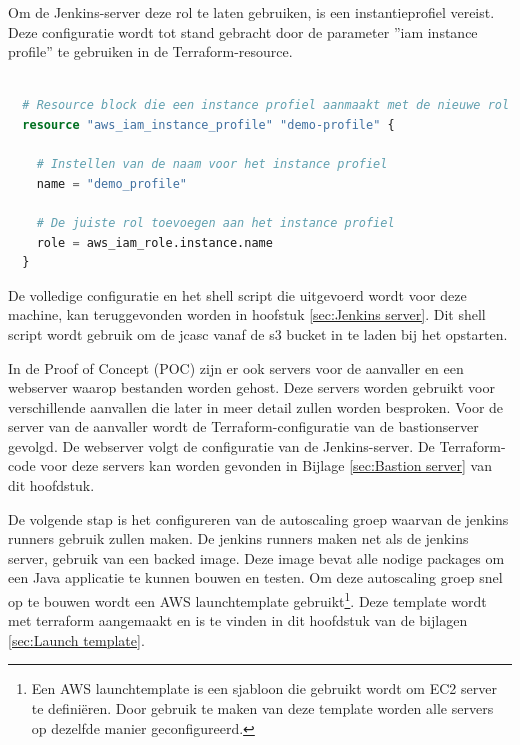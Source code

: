\vspace{0.5cm}
Om de Jenkins-server deze rol te laten gebruiken, is een instantieprofiel vereist. Deze configuratie wordt tot stand gebracht door de parameter ''iam instance profile'' te gebruiken in de Terraform-resource.
\newline

\begin{lstlisting}[language=terraform]
  
  # Resource block die een instance profiel aanmaakt met de nieuwe rol
  resource "aws_iam_instance_profile" "demo-profile" {

    # Instellen van de naam voor het instance profiel
    name = "demo_profile"

    # De juiste rol toevoegen aan het instance profiel
    role = aws_iam_role.instance.name
  } 
\end{lstlisting}

\vspace{0.5cm}
De volledige configuratie en het shell script die uitgevoerd wordt voor deze machine, kan teruggevonden worden in hoofstuk \ref{sec:Jenkins server}. Dit shell script wordt gebruik om de jcasc vanaf de s3 bucket in te laden bij het opstarten.
\newline

In de Proof of Concept (POC) zijn er ook servers voor de aanvaller en een webserver waarop bestanden worden gehost. Deze servers worden gebruikt voor verschillende aanvallen die later in meer detail zullen worden besproken. Voor de server van de aanvaller wordt de Terraform-configuratie van de bastionserver gevolgd. De webserver volgt de configuratie van de Jenkins-server. De Terraform-code voor deze servers kan worden gevonden in Bijlage \ref{sec:Bastion server} van dit hoofdstuk.
\newline

De volgende stap is het configureren van de autoscaling groep waarvan de jenkins runners gebruik zullen maken. De jenkins runners maken net als de jenkins server, gebruik van een backed image. Deze image bevat alle nodige packages om een Java applicatie te kunnen bouwen en testen. Om deze autoscaling groep snel op te bouwen wordt een AWS launchtemplate gebruikt\footnote{Een AWS launchtemplate is een sjabloon die gebruikt wordt om EC2 server te definiëren. Door gebruik te maken van deze template worden alle servers op dezelfde manier geconfigureerd. }. Deze template wordt met terraform aangemaakt en is te vinden in dit hoofdstuk van de bijlagen \ref{sec:Launch template}. 
\clearpage

